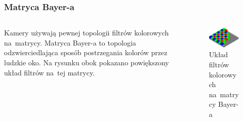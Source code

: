 \documentclass{beamer}
\begin{document}
\begin{frame}
  \frametitle{Matryca Bayer-a}
  
  \begin{columns}
  \begin{column}{5cm}
  Kamery używają pewnej topologii filtrów kolorowych na~matrycy. Matryca Bayer-a to topologia odzwierciedlająca
  sposób postrzegania kolorów przez ludzkie oko. Na rysunku obok pokazano powiększony układ
  filtrów na~tej matrycy.
  \end{column}
  \begin{column}{5cm}
    \begin{center}
    \begin{figure}

	  \includegraphics[width=\textwidth]{bayer_pattern_sensor}
	  \caption{Układ filtrów kolorowych na~matrycy Bayer-a}
	  \label{fig:pattern}
    \end{figure}
    \end{center}
	\end{column}
	\end{columns}
	
\end{frame}
\end{document}
